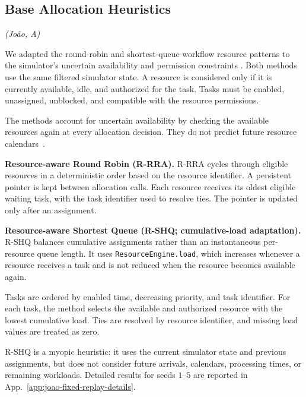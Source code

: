 \subsection{Base Allocation Heuristics}
\label{subsec:heuristics}
\textit{(João, A)}\quad

We adapted the round-robin and shortest-queue workflow resource patterns to the simulator's uncertain availability and permission constraints \cite{russell2005workflow}. Both methods use the
same filtered simulator state. A resource is considered only if it is currently
available, idle, and authorized for the task. Tasks must be enabled,
unassigned, unblocked, and compatible with the resource permissions.

The methods account for uncertain availability by checking the available
resources again at every allocation decision. They do not predict future
resource calendars~\cite{pufahl2025resourceallocation}.

\noindent\textbf{Resource-aware Round Robin (R-RRA).}
R-RRA cycles through eligible resources in a deterministic order based on the
resource identifier. A persistent pointer is kept between allocation calls.
Each resource receives its oldest eligible waiting task, with the task
identifier used to resolve ties. The pointer is updated only after an
assignment.

\noindent\textbf{Resource-aware Shortest Queue (R-SHQ; cumulative-load adaptation).} R-SHQ balances cumulative assignments rather than an instantaneous per-resource queue length. It
uses \texttt{ResourceEngine.load}, which increases whenever a resource receives
a task and is not reduced when the resource becomes available again.

Tasks are ordered by enabled time, decreasing priority, and task identifier.
For each task, the method selects the available and authorized resource with the
lowest cumulative load. Ties are resolved by resource identifier, and missing
load values are treated as zero.

R-SHQ is a myopic heuristic: it uses the current simulator state and previous
assignments, but does not consider future arrivals, calendars, processing
times, or remaining workloads. Detailed results for seeds $1$--$5$ are reported
in App.~\ref{app:joao-fixed-replay-details}.